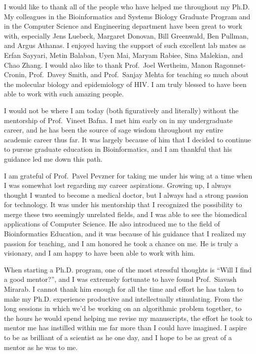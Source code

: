 \begin{frontmatter}

\listoffigures
\listoftables


\begin{acknowledgements}
I would like to thank all of the people who have helped me throughout my Ph.D. My colleagues in the Bioinformatics and Systems Biology Graduate Program and in the Computer Science and Engineering department have been great to work with, especially Jens Luebeck, Margaret Donovan, Bill Greenwald, Ben Pullman, and Argus Athanas. I enjoyed having the support of such excellent lab mates as Erfan Sayyari, Metin Balaban, Uyen Mai, Maryam Rabiee, Sina Malekian, and Chao Zhang.
I would also like to thank Prof.~Joel Wertheim, Manon Ragonnet-Cronin, Prof.~Davey Smith, and Prof.~Sanjay Mehta for teaching so much about the molecular biology and epidemiology of HIV.
I am truly blessed to have been able to work with such amazing people.

I would not be where I am today (both figuratively and literally) without the mentorship of Prof.~Vineet Bafna. I met him early on in my undergraduate career, and he has been the source of sage wisdom throughout my entire academic career thus far. It was largely because of him that I decided to continue to pursue graduate education in Bioinformatics, and I am thankful that his guidance led me down this path.

I am grateful of Prof.~Pavel Pevzner for taking me under his wing at a time when I was somewhat lost regarding my career aspirations. Growing up, I always thought I wanted to become a medical doctor, but I always had a strong passion for technology. It was under his mentorship that I recognized the possibility to merge these two seemingly unrelated fields, and I was able to see the biomedical applications of Computer Science. He also introduced me to the field of Bioinformatics Education, and it was because of his guidance that I realized my passion for teaching, and I am honored he took a chance on me. He is truly a visionary, and I am happy to have been able to work with him.

When starting a Ph.D. program, one of the most stressful thoughts is ``Will I find a good mentor?'', and I was extremely fortunate to have found Prof.~Siavash Mirarab. I cannot thank him enough for all the time and effort he has taken to make my Ph.D. experience productive and intellectually stimulating. From the long sessions in which we'd be working on an algorithmic problem together, to the hours he would spend helping me revise my manuscripts, the effort he took to mentor me has instilled within me far more than I could have imagined. I aspire to be as brilliant of a scientist as he one day, and I hope to be as great of a mentor as he was to me.


\end{acknowledgements}
\end{frontmatter}

